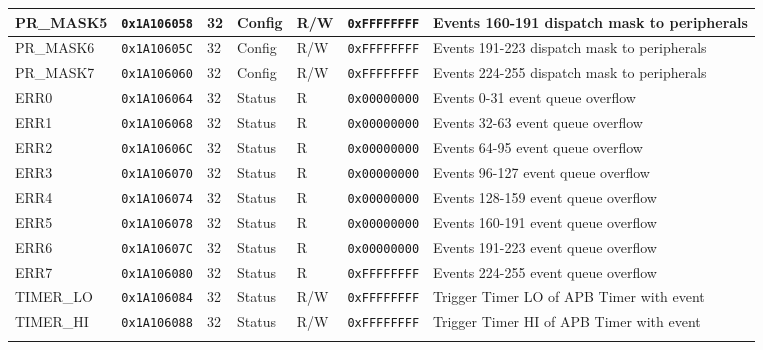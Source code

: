 {\begin{tabularx}{\textwidth}{|l|l|l|l|l|l|X|}
  \hline
  PR\_MASK5 & \texttt{0x1A106058} & 32 & Config & R/W    & \texttt{0xFFFFFFFF} & Events 160-191 dispatch mask to peripherals \\
  \hline
  PR\_MASK6 & \texttt{0x1A10605C} & 32 & Config & R/W    & \texttt{0xFFFFFFFF} & Events 191-223 dispatch mask to peripherals \\
  \hline
  PR\_MASK7 & \texttt{0x1A106060} & 32 & Config & R/W    & \texttt{0xFFFFFFFF} & Events 224-255 dispatch mask to peripherals \\
  \hline
  ERR0 & \texttt{0x1A106064} & 32 & Status & R    & \texttt{0x00000000} & Events 0-31 event queue overflow \\
  \hline
  ERR1 & \texttt{0x1A106068} & 32 & Status & R    & \texttt{0x00000000} & Events 32-63 event queue overflow \\
  \hline
  ERR2 & \texttt{0x1A10606C} & 32 & Status & R    & \texttt{0x00000000} & Events 64-95 event queue overflow \\
  \hline
  ERR3 & \texttt{0x1A106070} & 32 & Status & R    & \texttt{0x00000000} & Events 96-127 event queue overflow \\
  \hline
  ERR4 & \texttt{0x1A106074} & 32 & Status & R    & \texttt{0x00000000} & Events 128-159 event queue overflow \\
  \hline
  ERR5 & \texttt{0x1A106078} & 32 & Status & R    & \texttt{0x00000000} & Events 160-191 event queue overflow \\
  \hline
  ERR6 & \texttt{0x1A10607C} & 32 & Status & R    & \texttt{0x00000000} & Events 191-223 event queue overflow \\
  \hline
  ERR7 & \texttt{0x1A106080} & 32 & Status & R    & \texttt{0xFFFFFFFF} & Events 224-255 event queue overflow \\
  \hline
  TIMER\_LO & \texttt{0x1A106084} & 32 & Status & R/W & \texttt{0xFFFFFFFF} & Trigger Timer LO of APB Timer with event \\
  \hline
  TIMER\_HI & \texttt{0x1A106088} & 32 & Status & R/W & \texttt{0xFFFFFFFF} & Trigger Timer HI of APB Timer with event \\
  \hline
\caption{SoC Event Generator register table \label{tab:soc_eg_table}}
\end{tabularx}



}
